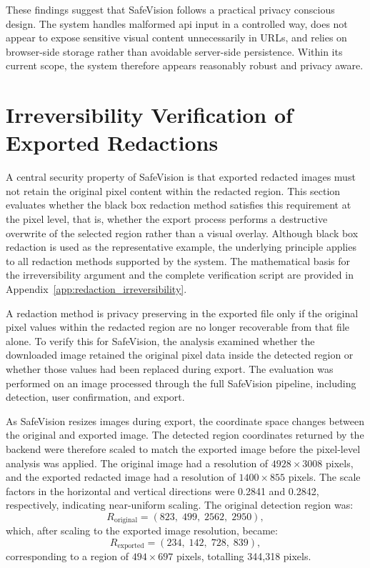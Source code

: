 These findings suggest that \gls{SafeVision} follows a practical privacy conscious design. The system handles malformed \acrshort{api} input in a controlled way, does not appear to expose sensitive visual content unnecessarily in URLs, and relies on browser-side storage rather than avoidable server-side persistence. Within its current scope, the system therefore appears reasonably robust and privacy aware.






\section{Irreversibility Verification of Exported Redactions}
\label{sec:irreversibility-verification}

A central security property of \gls{SafeVision} is that exported redacted images must not retain the original pixel content within the redacted region. This section evaluates whether the black box redaction method satisfies this requirement at the pixel level, that is, whether the export process performs a destructive overwrite of the selected region rather than a visual overlay. Although black box redaction is used as the representative example, the underlying principle applies to all redaction methods supported by the system. The mathematical basis for the irreversibility argument and the complete verification script are provided in Appendix~\ref{app:redaction_irreversibility}.


A redaction method is privacy preserving in the exported file only if the original pixel values within the redacted region are no longer recoverable from that file alone. To verify this for \gls{SafeVision}, the analysis examined whether the downloaded 
image retained the original pixel data inside the detected region or whether those values had been replaced during export. The evaluation was performed on an image processed through the full \gls{SafeVision} pipeline, including detection, user confirmation, and export.

As \gls{SafeVision} resizes images during export, the coordinate space changes between the original and exported image. The detected region coordinates returned by the backend were therefore scaled to match the exported image before the pixel-level analysis was applied. The original image had a resolution of $4928 \times 3008$ pixels, and the exported redacted image had a resolution of $1400 \times 855$ pixels. The scale factors in the horizontal and vertical directions were 0.2841 and 0.2842, respectively, indicating near-uniform scaling. The original detection region was:
\[
R_{\text{original}} = (823,\; 499,\; 2562,\; 2950),
\]
which, after scaling to the exported image resolution, became:
\[
R_{\text{exported}} = (234,\; 142,\; 728,\; 839),
\]
corresponding to a region of $494 \times 697$ pixels, totalling 344,318 pixels.

